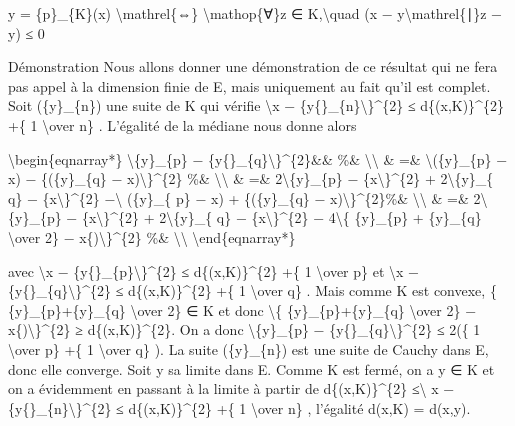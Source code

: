 \documentclass[]{article}
\begin{document}
y = \{p\}\_\{K\}(x) \textbackslash{}mathrel\{⇔\}
\textbackslash{}mathop\{∀\}z ∈ K,\textbackslash{}quad (x −
y\textbackslash{}mathrel\{∣\}z − y) ≤ 0

Démonstration Nous allons donner une démonstration de ce résultat qui ne
fera pas appel à la dimension finie de E, mais uniquement au fait qu'il
est complet. Soit (\{y\}\_\{n\}) une suite de K qui vérifie
\textbackslash{}\textbar{}x −
\{y\{\}\_\{n\}\textbackslash{}\textbar{}\}\^{}\{2\} ≤
d\{(x,K)\}\^{}\{2\} +\{ 1 \textbackslash{}over n\} . L'égalité de la
médiane nous donne alors

\textbackslash{}begin\{eqnarray*\}
\textbackslash{}\textbar{}\{y\}\_\{p\} −
\{y\{\}\_\{q\}\textbackslash{}\textbar{}\}\^{}\{2\}\&\& \%\&
\textbackslash{}\textbackslash{} \& =\&
\textbackslash{}\textbar{}(\{y\}\_\{p\} − x) − \{(\{y\}\_\{q\} −
x)\textbackslash{}\textbar{}\}\^{}\{2\} \%\&
\textbackslash{}\textbackslash{} \& =\&
2\textbackslash{}\textbar{}\{y\}\_\{p\} −
\{x\textbackslash{}\textbar{}\}\^{}\{2\} +
2\textbackslash{}\textbar{}\{y\}\_\{ q\} −
\{x\textbackslash{}\textbar{}\}\^{}\{2\} −\textbackslash{}\textbar{}
(\{y\}\_\{ p\} − x) + \{(\{y\}\_\{q\} −
x)\textbackslash{}\textbar{}\}\^{}\{2\}\%\&
\textbackslash{}\textbackslash{} \& =\&
2\textbackslash{}\textbar{}\{y\}\_\{p\} −
\{x\textbackslash{}\textbar{}\}\^{}\{2\} +
2\textbackslash{}\textbar{}\{y\}\_\{ q\} −
\{x\textbackslash{}\textbar{}\}\^{}\{2\} − 4\textbackslash{}\textbar{}\{
\{y\}\_\{p\} + \{y\}\_\{q\} \textbackslash{}over 2\} −
x\{)\textbackslash{}\textbar{}\}\^{}\{2\} \%\&
\textbackslash{}\textbackslash{} \textbackslash{}end\{eqnarray*\}

avec \textbackslash{}\textbar{}x −
\{y\{\}\_\{p\}\textbackslash{}\textbar{}\}\^{}\{2\} ≤
d\{(x,K)\}\^{}\{2\} +\{ 1 \textbackslash{}over p\} et
\textbackslash{}\textbar{}x −
\{y\{\}\_\{q\}\textbackslash{}\textbar{}\}\^{}\{2\} ≤
d\{(x,K)\}\^{}\{2\} +\{ 1 \textbackslash{}over q\} . Mais comme K est
convexe, \{ \{y\}\_\{p\}+\{y\}\_\{q\} \textbackslash{}over 2\} ∈ K et
donc \textbackslash{}\textbar{}\{ \{y\}\_\{p\}+\{y\}\_\{q\}
\textbackslash{}over 2\} − x\{)\textbackslash{}\textbar{}\}\^{}\{2\} ≥
d\{(x,K)\}\^{}\{2\}. On a donc \textbackslash{}\textbar{}\{y\}\_\{p\} −
\{y\{\}\_\{q\}\textbackslash{}\textbar{}\}\^{}\{2\} ≤ 2(\{ 1
\textbackslash{}over p\} +\{ 1 \textbackslash{}over q\} ). La suite
(\{y\}\_\{n\}) est une suite de Cauchy dans E, donc elle converge. Soit
y sa limite dans E. Comme K est fermé, on a y ∈ K et on a évidemment en
passant à la limite à partir de d\{(x,K)\}\^{}\{2\}
≤\textbackslash{}\textbar{} x −
\{y\{\}\_\{n\}\textbackslash{}\textbar{}\}\^{}\{2\} ≤
d\{(x,K)\}\^{}\{2\} +\{ 1 \textbackslash{}over n\} , l'égalité d(x,K) =
d(x,y).
\end{document}

